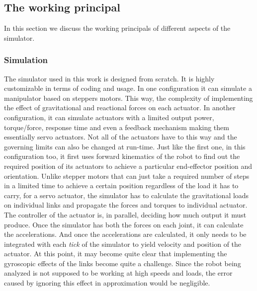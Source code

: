{    \subsection{The working principal}
    In this section we discuss the working principals of different aspects of the simulator.

    \subsubsection{Simulation}
    The simulator used in this work is designed from scratch. It is highly customizable in terms of coding and usage. In one configuration it can simulate a manipulator based on steppers motors. This way, the complexity of implementing the effect of gravitational and reactional forces on each actuator. In another configuration, it can simulate actuators with a limited output power, torque/force, response time and even a feedback mechanism making them essentially servo actuators. Not all of the actuators have to this way and the governing limits can also be changed at run-time. Just like the first one, in this configuration too, it first uses forward kinematics of the robot to find out the required position of its actuators to achieve a particular end-effector position and orientation. Unlike stepper motors that can just take a required number of steps in a limited time to achieve a certain position regardless of the load it has to carry, for a servo actuator, the simulator has to calculate the gravitational loads on individual links and propagate the forces and torques to individual actuator. The controller of the actuator is, in parallel, deciding how much output it must produce. Once the simulator has both the forces on each joint, it can calculate the accelerations. And once the accelerations are calculated, it only needs to be integrated with each \emph{tick} of the simulator to yield velocity and position of the actuator. At this point, it may become quite clear that implementing the gyroscopic effects of the links become quite a challenge. Since the robot being analyzed is not supposed to be working at high speeds and loads, the error caused by ignoring this effect in approximation would be negligible.

}
